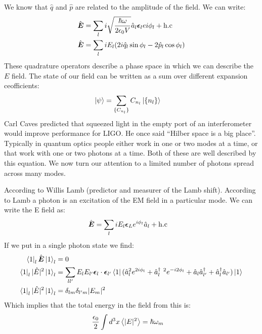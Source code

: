 We know that $\hat{q}$ and $\hat{p}$ are related to the amplitude of the field. We can write:
\begin{align*}
	\hat{\bm{E}} &= \sum_l i\sqrt{\frac{\hbar\omega}{2\epsilon_0 V}} \hat{a}_l \bm{\epsilon}_l e{i\phi_l} + \text{h.c} \\
	\hat{\bm{E}} &= \sum_l iE_l (2i\hat{q}_l \sin\phi_l - 2\hat{p}_l\cos\phi_l)
\end{align*}
These quadrature operators describe a phase space in which we can describe the $E$ field. The state of our field can be written as a sum over different expansion ceofficients:
\begin{align*}
	\ket{\psi} &= \sum_{\{C_{n_l}\}} C_{n_l} \ket{\{n_l\}}
\end{align*}
Carl Caves predicted that squeezed light in the empty port of an interferometer would improve performance for LIGO. He once said ``Hilber space is a big place''.
Typically in quantum optics people either work in one or two modes at a time, or that work with one or two photons at a time. Both of these are well described by this equation.
We now turn our attention to a limited number of photons spread across many modes.

According to Willis Lamb (predictor and measurer of the Lamb shift). According to Lamb a photon is an excitation of the EM field in a particular mode. We can write the E field as:
\begin{align*}
	\hat{\bm{E}} &= \sum_l iE_l \bm{\epsilon}_L e^{i\phi_l} \hat{a}_l + \text{h.c}
\end{align*}
If we put in a single photon state we find:
\begin{align*}
	\bra{1}_l \hat{\bm{E}} \ket{1}_l &= 0 \\
	\bra{1}_l |\hat{E}|^2 \ket{1}_l &= \sum_{ll'} E_l E_{l'} \bm{\epsilon}_l\cdot\bm{\epsilon}_{l'} \bra{1}(\hat{a}_l^2 e^{2i\phi_l} + \hat{a}_l^\dagger\ ^2 e^{-i2\phi_{l}} + \hat{a}_l\hat{a}^\dagger_{l'} + \hat{a}^\dagger_l\hat{a}_{l'})\ket{1} \\
	\bra{1}_l |\hat{E}|^2 \ket{1}_l &= \delta_{lm}\delta_{l'm} |E_m|^2
\end{align*}
Which implies that the total energy in the field from this is:
\begin{align*}
	\frac{\epsilon_0}{2}\int d^3 x\expval{|E|^2} &= \hbar\omega_m
\end{align*}

